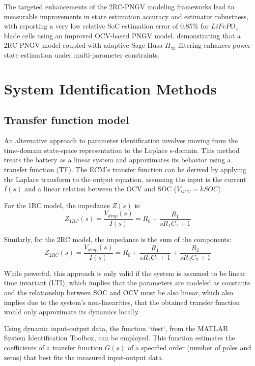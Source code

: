 \documentclass[lettersize,journal]{IEEEtran}
\begin{document}
The targeted enhancements of the 2RC-PNGV modeling frameworks lead to measurable improvements in state estimation accuracy and estimator robustness, with \cite{Tao2023} reporting a very low relative SoC estimation error of 0.85$\%$ for $LiFePO_4$ blade cells using an improved OCV-based PNGV model\cite{Tao2023,Xinyu2025}. demonstrating that a 2RC-PNGV model coupled with adaptive Sage-Husa $H_{\infty}$ filtering enhances power state estimation under multi-parameter constraints\cite{Xinyu2025}.

\section{System Identification Methods}

\subsection{Transfer function model}

An alternative approach to parameter identification involves moving from the time-domain state-space representation to the Laplace s-domain. This method treats the battery as a linear system and approximates its behavior using a transfer function (TF). The ECM's transfer function can be derived by applying the Laplace transform to the output equation, assuming the input is the current $I(s)$ and a linear relation between the OCV and SOC ($V_{OCV}=kSOC$).

For the 1RC model, the impedance $Z(s)$ is:
\begin{equation}
	\label{eq:tf_1rc}
	Z_{1RC}(s) = \frac{V_{drop}(s)}{I(s)} = R_0 + \frac{R_1}{sR_1C_1 + 1}
\end{equation}

Similarly, for the 2RC model, the impedance is the sum of the components:
\begin{equation}
	\label{eq:tf_2rc}
	Z_{2RC}(s) = \frac{V_{drop}(s)}{I(s)} = R_0 + \frac{R_1}{sR_1C_1 + 1} + \frac{R_2}{sR_2C_2 + 1}
\end{equation}

While powerful, this approach is only valid if the system is assumed to be linear time invariant (LTI), which implies that the parameters are modeled as constants and the relationship between SOC and OCV must be also linear, which also implies due to the system's non-linearities, that the obtained transfer function would only approximate its dynamics locally.

Using dynamic input-output data, the function `tfest`, from the MATLAB System Identification Toolbox,  can be employed. This function estimates the coefficients of a transfer function $G(s)$ of a specified order (number of poles and zeros) that best fits the measured input-output data.
\end{document}

